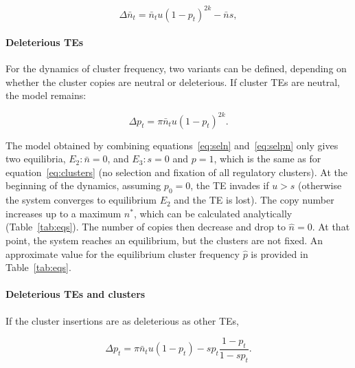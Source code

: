 \documentclass[10pt,a4paper]{article}
\begin{document}
\begin{equation}\label{eq:seln}
\Delta \bar n_t = \bar n_t u (1-p_t)^{2k} - \bar n s,
\end{equation}

\paragraph{Deleterious TEs} For the dynamics of cluster frequency, two variants can be defined, depending on whether the cluster copies are neutral or deleterious. If cluster TEs are neutral, the model remains:

\begin{equation}\label{eq:selpn}
\Delta p_t = \pi \bar n_t u (1-p_t)^{2k}.
\end{equation}

The model obtained by combining equations~\ref{eq:seln} and~\ref{eq:selpn} only gives two equilibria, $E_2: \bar n = 0$, and $E_3: s=0$ and $p=1$, which is the same as for equation~\ref{eq:clusters} (no selection and fixation of all regulatory clusters). At the beginning of the dynamics, assuming $p_0 = 0$, the TE invades if $u > s$ (otherwise the system converges to equilibrium $E_2$ and the TE is lost). The copy number increases up to a maximum $n^\ast$, which can be calculated analytically (Table~\ref{tab:eqs}). The number of copies then decrease and drop to $\hat n = 0$. At that point, the system reaches an equilibrium, but the clusters are not fixed. An approximate value for the equilibrium cluster frequency $\hat p$ is provided in Table~\ref{tab:eqs}.

\paragraph{Deleterious TEs and clusters} If the cluster insertions are as deleterious as other TEs, 

\begin{equation}\label{eq:selps}
\Delta p_t = \pi \bar n_t u (1-p_t) - s p_t \frac{1-p_t}{1- s p_t}.
\end{equation}
\end{document}
